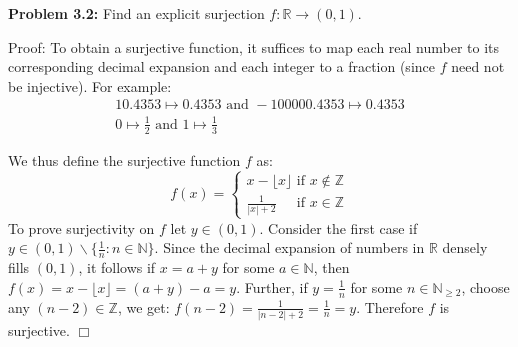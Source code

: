 \documentclass[11pt]{article}
\begin{document}
\textbf{Problem 3.2:} Find an explicit surjection $f : \mathbb{R} \rightarrow (0, 1)$.

Proof: To obtain a surjective function, it suffices to map each real number to its corresponding decimal expansion and each integer to a fraction (since $f$ need not be injective). For example:
\begin{gather*}
    10.4353 \mapsto 0.4353 \text{  and  } -100000.4353 \mapsto 0.4353 \\
    0 \mapsto \frac{1}{2} \text{ and } 1 \mapsto \frac{1}{3}
\end{gather*}

We thus define the surjective function $f$ as:
\begin{equation*}
    f(x) = 
    \begin{cases}
        x - \lfloor x \rfloor \text{ if } x \notin \mathbb{Z} \\
        \frac{1}{|x| + 2} \; \; \; \; \text{ if } x \in \mathbb{Z}
    \end{cases}
\end{equation*}
To prove surjectivity on $f$ let $y \in (0, 1)$. Consider the first case if $y \in (0, 1) \backslash \{\frac{1}{n} : n \in \mathbb{N}\}$. Since the decimal expansion of numbers in $\mathbb{R}$ densely fills $(0, 1)$, it follows if $x = a + y$ for some $a \in \mathbb{N}$, then $f(x) = x - \lfloor x \rfloor = (a + y) - a = y$. Further, if $y = \frac{1}{n}$ for some $n \in \mathbb{N}_{\geq 2}$, choose any $(n - 2) \in \mathbb{Z}$, we get: $f(n - 2) = \frac{1}{|n -2| + 2} = \frac{1}{n} = y$. Therefore $f$ is surjective. $\Box$
\end{document}
